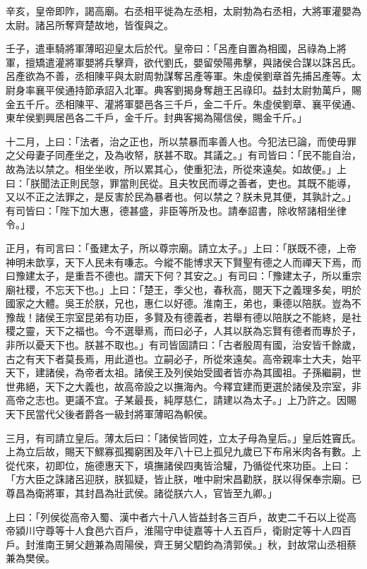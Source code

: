 \begin{pinyinscope}
辛亥，皇帝即阼，謁高廟。右丞相平徙為左丞相，太尉勃為右丞相，大將軍灌嬰為太尉。諸呂所奪齊楚故地，皆復與之。

壬子，遣車騎將軍薄昭迎皇太后於代。皇帝曰：「呂產自置為相國，呂祿為上將軍，擅矯遣灌將軍嬰將兵擊齊，欲代劉氏，嬰留滎陽弗擊，與諸侯合謀以誅呂氏。呂產欲為不善，丞相陳平與太尉周勃謀奪呂產等軍。朱虛侯劉章首先捕呂產等。太尉身率襄平侯通持節承詔入北軍。典客劉揭身奪趙王呂祿印。益封太尉勃萬戶，賜金五千斤。丞相陳平、灌將軍嬰邑各三千戶，金二千斤。朱虛侯劉章、襄平侯通、東牟侯劉興居邑各二千戶，金千斤。封典客揭為陽信侯，賜金千斤。」

十二月，上曰：「法者，治之正也，所以禁暴而率善人也。今犯法已論，而使毋罪之父母妻子同產坐之，及為收帑，朕甚不取。其議之。」有司皆曰：「民不能自治，故為法以禁之。相坐坐收，所以累其心，使重犯法，所從來遠矣。如故便。」上曰：「朕聞法正則民愨，罪當則民從。且夫牧民而導之善者，吏也。其既不能導，又以不正之法罪之，是反害於民為暴者也。何以禁之？朕未見其便，其孰計之。」有司皆曰：「陛下加大惠，德甚盛，非臣等所及也。請奉詔書，除收帑諸相坐律令。」

正月，有司言曰：「蚤建太子，所以尊宗廟。請立太子。」上曰：「朕既不德，上帝神明未歆享，天下人民未有嗛志。今縱不能博求天下賢聖有德之人而禪天下焉，而曰豫建太子，是重吾不德也。謂天下何？其安之。」有司曰：「豫建太子，所以重宗廟社稷，不忘天下也。」上曰：「楚王，季父也，春秋高，閱天下之義理多矣，明於國家之大體。吳王於朕，兄也，惠仁以好德。淮南王，弟也，秉德以陪朕。豈為不豫哉！諸侯王宗室昆弟有功臣，多賢及有德義者，若舉有德以陪朕之不能終，是社稷之靈，天下之福也。今不選舉焉，而曰必子，人其以朕為忘賢有德者而專於子，非所以憂天下也。朕甚不取也。」有司皆固請曰：「古者殷周有國，治安皆千餘歲，古之有天下者莫長焉，用此道也。立嗣必子，所從來遠矣。高帝親率士大夫，始平天下，建諸侯，為帝者太祖。諸侯王及列侯始受國者皆亦為其國祖。子孫繼嗣，世世弗絕，天下之大義也，故高帝設之以撫海內。今釋宜建而更選於諸侯及宗室，非高帝之志也。更議不宜。子某最長，純厚慈仁，請建以為太子。」上乃許之。因賜天下民當代父後者爵各一級封將軍薄昭為軹侯。

三月，有司請立皇后。薄太后曰：「諸侯皆同姓，立太子母為皇后。」皇后姓竇氏。上為立后故，賜天下鰥寡孤獨窮困及年八十已上孤兒九歲已下布帛米肉各有數。上從代來，初即位，施德惠天下，填撫諸侯四夷皆洽驩，乃循從代來功臣。上曰：「方大臣之誅諸呂迎朕，朕狐疑，皆止朕，唯中尉宋昌勸朕，朕以得保奉宗廟。已尊昌為衛將軍，其封昌為壯武侯。諸從朕六人，官皆至九卿。」

上曰：「列侯從高帝入蜀、漢中者六十八人皆益封各三百戶，故吏二千石以上從高帝潁川守尊等十人食邑六百戶，淮陽守申徒嘉等十人五百戶，衛尉定等十人四百戶。封淮南王舅父趙兼為周陽侯，齊王舅父駟鈞為清郭侯。」秋，封故常山丞相蔡兼為樊侯。


\end{pinyinscope}
